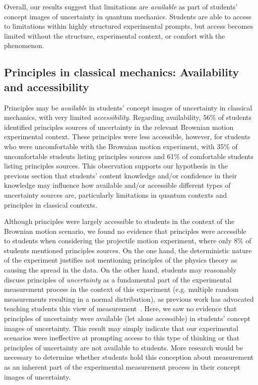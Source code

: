 \documentclass[english,aps,prstper,reprint,showpacs,longbibliography,superscriptaddress,nofootinbib]{revtex4-2}
\begin{document}
Overall, our results suggest that limitations are \emph{available} as part of students' concept images of uncertainty in quantum mechanics. Students are able to access to limitations within highly structured experimental prompts, but access becomes limited without the structure, experimental context, or comfort with the phenomenon. %

\subsection{Principles in classical mechanics: Availability and accessibility}

Principles may be \emph{available} in students' concept images of uncertainty in classical mechanics, with very limited \emph{accessibility}. Regarding availability, 56\% of students identified principles sources of uncertainty in the relevant Brownian motion experimental context. These principles were less accessible, however, for students who were uncomfortable with the Brownian motion experiment, with 35\% of uncomfortable students listing principles sources and 61\% of comfortable students listing principles sources. This observation supports our hypothesis in the previous section that students' content knowledge and/or confidence in their knowledge may influence how available and/or accessible different types of uncertainty sources are, particularly limitations in quantum contexts and principles in classical contexts.

Although principles were largely accessible to students in the context of the Brownian motion scenario, we found no evidence that principles were accessible to students when considering the projectile motion experiment, where only 8\% of students mentioned principles sources. On the one hand, the deterministic nature of the experiment justifies not mentioning principles of the physics theory as causing the spread in the data. On the other hand, students may reasonably discuss principles of \emph{uncertainty} as a fundamental part of the experimental measurement process in the context of this experiment (e.g. multiple random measurements resulting in a normal distribution), as previous work has advocated teaching students this view of measurement~\cite{Evangelinos1999,Evangelinos2002,Allie2003,Pillay2008,Buffler2008}. Here, we saw no evidence that principles of uncertainty were available (let alone accessible) in students' concept images of uncertainty. This result may simply indicate that our experimental scenarios were ineffective at prompting access to this type of thinking or that principles of uncertainty are not available to students. More research would be necessary to determine whether students hold this conception about measurement as an inherent part of the experimental measurement process in their concept images of uncertainty.
\end{document}
